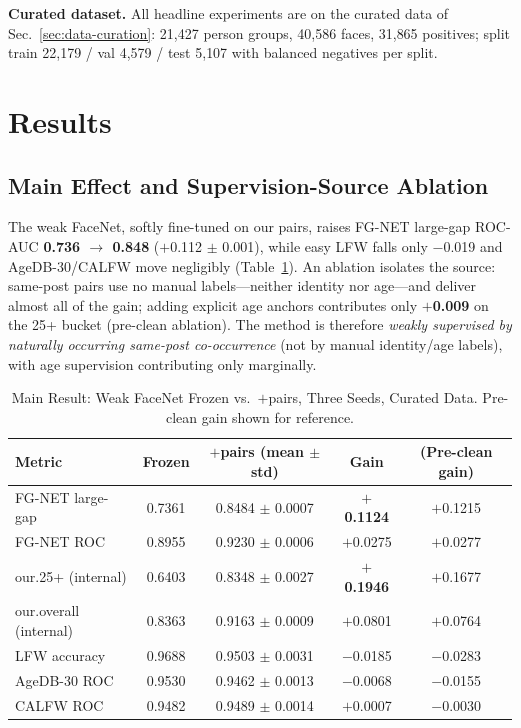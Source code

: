 \documentclass[journal]{IEEEtran}
\begin{document}
\textbf{Curated dataset.} All headline experiments are on the curated data of Sec.~\ref{sec:data-curation}: 21{,}427 person groups, 40{,}586 faces, 31{,}865 positives; split train 22{,}179 / val 4{,}579 / test 5{,}107 with balanced negatives per split.

\section{Results}\label{sec:results}
\subsection{Main Effect and Supervision-Source Ablation}\label{sec:res-main}
The weak FaceNet, softly fine-tuned on our pairs, raises FG-NET large-gap ROC-AUC \textbf{0.736 $\rightarrow$ 0.848} ($+$0.112 $\pm$ 0.001), while easy LFW falls only $-$0.019 and AgeDB-30/CALFW move negligibly (Table~\ref{tab:main}). An ablation isolates the source: same-post pairs use no manual labels---neither identity nor age---and deliver almost all of the gain; adding explicit age anchors contributes only \textbf{$+$0.009} on the 25+ bucket (pre-clean ablation). The method is therefore \emph{weakly supervised by naturally occurring same-post co-occurrence} (not by manual identity/age labels), with age supervision contributing only marginally.

\begin{table}[!t]
\renewcommand{\arraystretch}{1.2}
\caption{Main Result: Weak FaceNet Frozen vs.\ $+$pairs, Three Seeds, Curated Data. Pre-clean gain shown for reference.}
\label{tab:main}
\centering
\footnotesize
\begin{tabular}{@{}lcccc@{}}
\toprule
Metric & Frozen & $+$pairs (mean $\pm$ std) & Gain & (Pre-clean gain) \\
\midrule
FG-NET large-gap & 0.7361 & 0.8484 $\pm$ 0.0007 & \textbf{$+$0.1124} & $+$0.1215 \\
FG-NET ROC & 0.8955 & 0.9230 $\pm$ 0.0006 & $+$0.0275 & $+$0.0277 \\
our.25+ (internal) & 0.6403 & 0.8348 $\pm$ 0.0027 & \textbf{$+$0.1946} & $+$0.1677 \\
our.overall (internal) & 0.8363 & 0.9163 $\pm$ 0.0009 & $+$0.0801 & $+$0.0764 \\
LFW accuracy & 0.9688 & 0.9503 $\pm$ 0.0031 & $-$0.0185 & $-$0.0283 \\
AgeDB-30 ROC & 0.9530 & 0.9462 $\pm$ 0.0013 & $-$0.0068 & $-$0.0155 \\
CALFW ROC & 0.9482 & 0.9489 $\pm$ 0.0014 & $+$0.0007 & $-$0.0030 \\
\bottomrule
\end{tabular}
\end{table}
\end{document}
